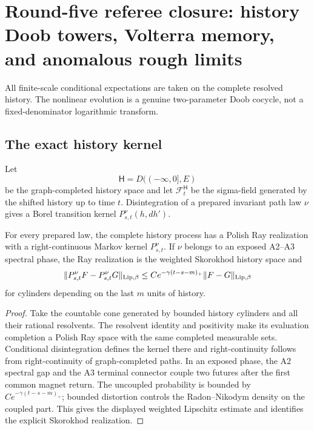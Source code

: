 \section{Round-five referee closure: history Doob towers, Volterra memory, and anomalous rough limits}
\label{sec:r5-a4}

All finite-scale conditional expectations are taken on the complete resolved
history.  The nonlinear evolution is a genuine two-parameter Doob cocycle,
not a fixed-denominator logarithmic transform.

\subsection{The exact history kernel}

Let
\[
 {\mathsf H}=D(( -\infty,0],E)
\]
be the graph-completed history space and let
\({\mathcal F}^{\mathsf H}_t\) be the sigma-field generated by the shifted
history up to time \(t\).  Disintegration of a prepared invariant path law
\(\nu\) gives a Borel transition kernel
\(P^\nu_{s,t}(h,dh')\).

\begin{theorem}
\label{thm:r5-a4-history}
For every prepared law, the complete history process has a Polish Ray
realization with a right-continuous Markov kernel \(P^\nu_{s,t}\).  If \(\nu\)
belongs to an exposed A2--A3 spectral phase, the Ray realization is the
weighted Skorokhod history space and
\[
 \|P^\nu_{s,t}F-P^\nu_{s,t}G\|_{\rm Lip,\beta}
 \le Ce^{-\gamma(t-s-m)_+}\|F-G\|_{\rm Lip,\beta}
\]
for cylinders depending on the last \(m\) units of history.
\end{theorem}

\begin{proof}
Take the countable cone generated by bounded history cylinders and all their
rational resolvents.  The resolvent identity and positivity make its
evaluation completion a Polish Ray space with the same completed measurable
sets.  Conditional disintegration defines the kernel there and
right-continuity follows from right-continuity of graph-completed paths.  In
an exposed phase, the A2 spectral gap and the A3 terminal connector couple
two futures after the first common magnet return.  The uncoupled probability
is bounded by \(Ce^{-\gamma(t-s-m)_+}\); bounded distortion controls the
Radon--Nikodym density on the coupled part.  This gives the displayed
weighted Lipschitz estimate and identifies the explicit Skorokhod
realization.
\end{proof}

